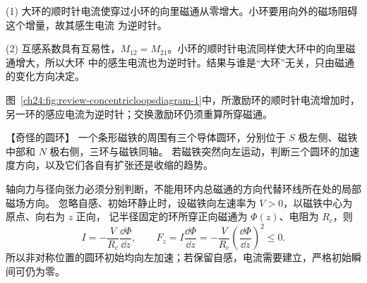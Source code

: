 {\begin{xesolution}
(1) 大环的顺时针电流使穿过小环的向里磁通从零增大。小环要用向外的磁场阻碍这个增量，故其感生电流
为逆时针。

(2) 互感系数具有互易性，$M_{12}=M_{21}$。小环的顺时针电流同样使大环中的向里磁通增大，所以大环
中的感生电流也为逆时针。结果与谁是“大环”无关，只由磁通的变化方向决定。

图~\ref{ch24:fig:review-concentricloopsdiagram-1}中，所激励环的顺时针电流增加时，另一环的感应电流为逆时针；交换激励环仍须重算所穿磁通。
\par\noindent\begin{minipage}{\linewidth}
\concentricLoopsDiagram
{}
\end{minipage}\par\medskip
\end{xesolution}



\begin{origexamplebox}{【奇怪的圆环】}\label{ch24:ex:s40-9-2}
一个条形磁铁的周围有三个导体圆环，分别位于 $S$ 极左侧、磁铁中部和 $N$ 极右侧，三环与磁铁同轴。
若磁铁突然向左运动，判断三个圆环的加速度方向，以及它们各自有扩张还是收缩的趋势。

%
\begin{center}\end{center}
\end{origexamplebox}

\begin{xesolution}
轴向力与径向张力必须分别判断，不能用环内总磁通的方向代替环线所在处的局部磁场方向。
忽略自感、初始环静止时，设磁铁向左速率为 $V>0$，以磁铁中心为原点、向右为 $z$ 正向，
记半径固定的环所穿正向磁通为 $\Phi(z)$、电阻为 $R_c$，则
\[
 I=-\frac{V}{R_c}\frac{\dd\Phi}{\dd z},\qquad
 F_z=I\frac{\dd\Phi}{\dd z}=-\frac V{R_c}\left(\frac{\dd\Phi}{\dd z}\right)^2\le0.
\]
所以非对称位置的圆环初始均向左加速；若保留自感，电流需要建立，严格初始瞬间可仍为零。


\end{xesolution}}
